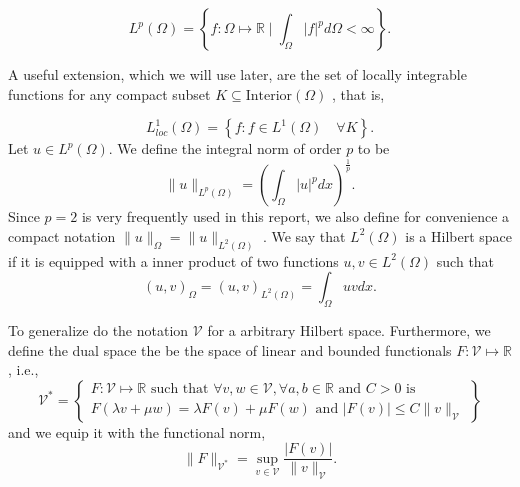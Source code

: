 \begin{equation*}
    L^{p}\left( \Omega  \right) = \left\{ f: \Omega \mapsto \mathbb{R}  \mid \int_{\Omega }^{} \left\lvert f \right\rvert ^{p} d \Omega  < \infty  \right\}
.\end{equation*}

A useful extension, which we will use later, are the set of locally integrable functions for any compact subset $K \subseteq \text{Interior}\left( \Omega  \right) $ \cite{brenner07math}, that is,

\begin{equation*}
    L_{loc}^{1}\left( \Omega  \right)  = \left\{ f: f \in L^{1}\left( \Omega  \right)  \quad \forall K  \right\}.
\end{equation*}
Let $u \in L^{p}\left( \Omega  \right) $. We define the integral norm of order $p$ to be \[
\| u \|_{ L^{p}\left( \Omega  \right)  }^{  }  = \left( \int_{\Omega }^{} \left\lvert u \right\rvert ^{p} dx  \right) ^{\frac{1}{p}}.
\]
Since $p=2$ is very frequently used in this report, we also define for convenience a compact notation $\| u \|_{ \Omega  }^{  }  = \| u \|_{ L^{2}\left( \Omega  \right)  }^{  } $ .  We say that $L^{2}\left( \Omega  \right) $ is a Hilbert space if it is equipped with a inner
product of two functions $u,v \in L^{2}\left( \Omega  \right) $ such that
\[
\left( u,v \right) _{\Omega } = \left( u,v \right) _{L^2\left( \Omega  \right) } = \int_{\Omega }^{} u  v dx.
\]

To generalize do the notation $\mathcal{V} $ for a arbitrary Hilbert space. Furthermore, we define the dual space the be the space of linear and bounded functionals $F: \mathcal{V}  \mapsto \mathbb{R} $\cite{quartdiff}, i.e., \[
\mathcal{V} ^{*} =
\left.
\begin{cases}
F: \mathcal{V}  \mapsto \mathbb{R} \text{ such that }\forall v,w \in \mathcal{V}, \forall a,b \in \mathbb{R} \text{ and } C> 0 \text{ is }   \\
  F\left( \lambda v + \mu w  \right) = \lambda F(v) + \mu F(w) \text{ and } \left\lvert F\left( v \right)  \right\rvert \le C \| v \|_{ \mathcal{V}  }^{  }
\end{cases}
  \right\}
\]
and we equip it with the functional norm,  \[
    \| F \|_{ \mathcal{V} ^{*} }^{  } = \sup_{v \in \mathcal{V}   } \frac{\left\lvert F\left( v \right)  \right\rvert }{\| v \|_{ \mathcal{V}  }^{  } }.
\]

